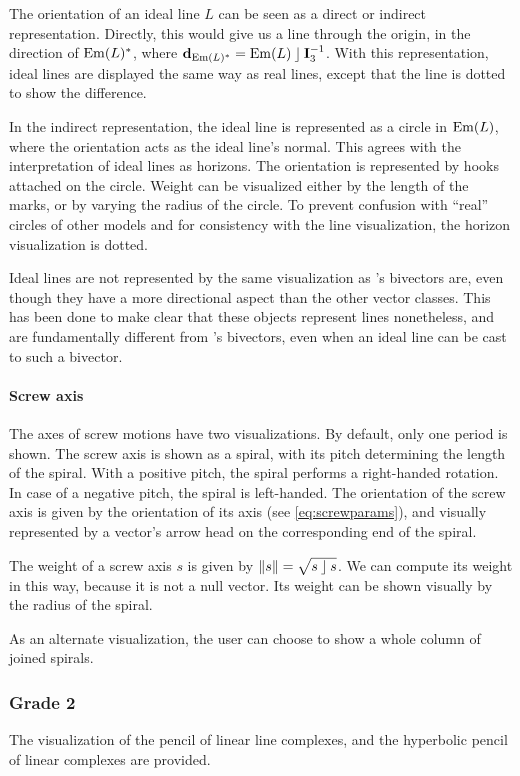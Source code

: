 The orientation of an ideal line $L$ can be seen as a direct or indirect representation.  Directly, this would give us a line through the origin, in the direction of $\operatorname{Em}(L)^\ast$, where $\mathbf{d}_{\operatorname{Em}(L)^\ast} = \operatorname{Em}(L) \mathbin{\rfloor} \mathbf{I}_3^{-1}$.  With this representation, ideal lines are displayed the same way as real lines, except that the line is dotted to show the difference. 

In the indirect representation, the ideal line is represented as a circle in $\operatorname{Em}(L)$, where the orientation acts as the ideal line's normal.  This agrees with the interpretation of ideal lines as horizons.  The orientation is represented by hooks attached on the circle.  Weight can be visualized either by the length of the marks, or by varying the radius of the circle.  To prevent confusion with ``real'' circles of other models and for consistency with the line visualization, the horizon visualization is dotted.

Ideal lines are not represented by the same visualization as \ega's bivectors are, even though they have a more directional aspect than the other vector classes.  This has been done to make clear that these objects represent lines nonetheless, and are fundamentally different from \ega's bivectors, even when an ideal line can be cast to such a bivector.

\paragraph{Screw axis}
The axes of screw motions have two visualizations.  By default, only one period is shown.  The screw axis is shown as a spiral, with its pitch determining the length of the spiral.  With a positive pitch, the spiral performs a right-handed rotation.  In case of a negative pitch, the spiral is left-handed.  The orientation of the screw axis is given by the orientation of its axis (see \autoref{eq:screwparams}), and visually represented by a vector's arrow head on the corresponding end of the spiral.

The weight of a screw axis $s$ is given by $\left\|s\right\| = \sqrt{s \mathbin{\rfloor} s}$.  We can compute its weight in this way, because it is not a null vector.  Its weight can be shown visually by the radius of the spiral.

As an alternate visualization, the user can choose to show a whole column of joined spirals.

\subsubsection{Grade 2}
The visualization of the pencil of linear line complexes, and the hyperbolic pencil of linear complexes are provided. 

